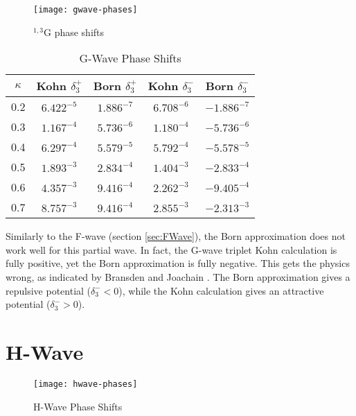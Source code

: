 \documentclass[Dissertation.tex]{subfiles}
\begin{document}
\begin{figure}[H]
	\centering
	\texttt{[image: gwave-phases]}
	\caption{$^{1,3}$G phase shifts}
	\label{fig:GWavePhase}
\end{figure}

\setlength{\abovecaptionskip}{6pt}
\setlength{\belowcaptionskip}{6pt}
\begin{table}[H]
\centering
\begin{tabular}{c | c c | c c}
\toprule
$\kappa$ & Kohn $\delta_3^+$ & Born $\delta_3^+$ & Kohn $\delta_3^-$ & Born $\delta_3^-$ \\
\midrule
0.2 &	$6.422^{-5}$ & $1.886^{-7}$ & $6.708^{-6}$ & $-1.886^{-7}$ \\
0.3 &	$1.167^{-4}$ & $5.736^{-6}$ & $1.180^{-4}$ & $-5.736^{-6}$ \\
0.4 &	$6.297^{-4}$ & $5.579^{-5}$ & $5.792^{-4}$ & $-5.578^{-5}$ \\
0.5 &	$1.893^{-3}$ & $2.834^{-4}$ & $1.404^{-3}$ & $-2.833^{-4}$ \\
0.6 &	$4.357^{-3}$ & $9.416^{-4}$ & $2.262^{-3}$ & $-9.405^{-4}$ \\
0.7 &	$8.757^{-3}$ & $9.416^{-4}$ & $2.855^{-3}$ & $-2.313^{-3}$ \\
\bottomrule
\end{tabular}
\caption{G-Wave Phase Shifts}
\label{tab:GWavePhase}
\end{table}

Similarly to the F-wave (section \ref{sec:FWave}), the Born approximation does not work well for this partial wave. In fact, the G-wave triplet Kohn calculation is fully positive, yet the Born approximation is fully negative. This gets the physics wrong, as indicated by Bransden and Joachain \citep[pg. 589]{Bransden2003}. The Born approximation gives a repulsive potential ($\delta_3^- < 0$), while the Kohn calculation gives an attractive potential ($\delta_3^- > 0$).


\section{H-Wave}
\label{sec:HWave}

\begin{figure}[H]
	\centering
	\texttt{[image: hwave-phases]}
	\caption{H-Wave Phase Shifts}
	\label{fig:HWavePhase}
\end{figure}
\end{document}
